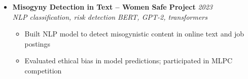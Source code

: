 \documentclass[a4paper,11pt]{article}
\begin{document}
\begin{itemize}[leftmargin=*, label={-}]
\item \textbf{Misogyny Detection in Text -- Women Safe Project} \hfill \textit{2023} \\
\textit{NLP classification, risk detection} \hfill \textit{BERT, GPT-2, transformers}
\vspace{-2pt}
    \begin{itemize}[leftmargin=0.4cm, nosep, label=\tiny$\bullet$]
        \item \small{Built NLP model to detect misogynistic content in online text and job postings}
        \item \small{Evaluated ethical bias in model predictions; participated in MLPC competition}
    \end{itemize}
\vspace{3pt}

\end{itemize}
\end{document}
